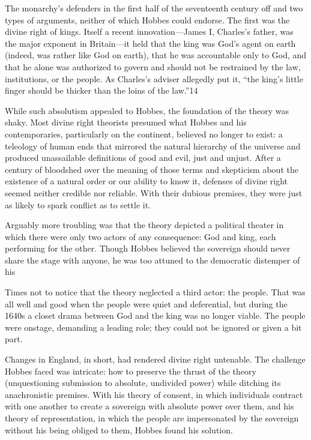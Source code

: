  \par 
The monarchy’s defenders in the first half of the seventeenth century off and two types of arguments, neither of which Hobbes could endorse. The first was the divine right of kings. Itself a recent innovation—James I, Charles’s father, was the major exponent in Britain—it held that the king was God’s agent on earth (indeed, was rather like God on earth), that he was accountable only to God, and that he alone was authorized to govern and should not be restrained by the law, institutions, or the people. As Charles’s adviser allegedly put it, “the king’s little finger should be thicker than the loins of the law.”{\color{blue}14}
 \par 
While such absolutism appealed to Hobbes, the foundation of the theory was shaky. Most divine right theorists presumed what Hobbes and his contemporaries, particularly on the continent, believed no longer to exist: a teleology of human ends that mirrored the natural hierarchy of the universe and produced unassailable definitions of good and evil, just and unjust. After a century of bloodshed over the meaning of those terms and skepticism about the existence of a natural order or our ability to know it, defenses of divine right seemed neither credible nor reliable. With their dubious premises, they were just as likely to spark conflict as to settle it.
 \par 
Arguably more troubling was that the theory depicted a political theater in which there were only two actors of any consequence: God and king, each performing for the other. Though Hobbes believed the sovereign should never share the stage with anyone, he was too attuned to the democratic distemper of his
 \par 
Times not to notice that the theory neglected a third actor: the people. That was all well and good when the people were quiet and deferential, but during the 1640s a closet drama between God and the king was no longer viable. The people were onstage, demanding a leading role; they could not be ignored or given a bit part.
 \par 
Changes in England, in short, had rendered divine right untenable. The challenge Hobbes faced was intricate: how to preserve the thrust of the theory (unquestioning submission to absolute, undivided power) while ditching its anachronistic premises. With his theory of consent, in which individuals contract with one another to create a sovereign with absolute power over them, and his theory of representation, in which the people are impersonated by the sovereign without his being obliged to them, Hobbes found his solution.
